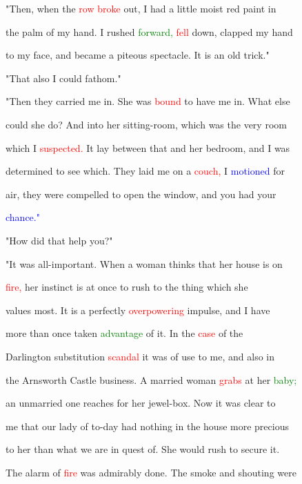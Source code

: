 "Then, when the \textcolor{red}{row} \textcolor{red}{broke} out, I had a little moist red paint in

 the palm of my hand. I rushed \textcolor{green}{forward,} \textcolor{red}{fell} down, clapped my hand

 to my face, and became a piteous \textcolor{BurntOrange}{spectacle.} It is an old \textcolor{BurntOrange}{trick."}



 "That also I could fathom."



 "Then they carried me in. She was \textcolor{red}{bound} to have me in. What else

 could she do? And into her sitting-room, which was the very room

 which I \textcolor{red}{suspected.} It lay between that and her bedroom, and I was

 determined to see which. They laid me on a \textcolor{red}{couch,} I \textcolor{blue}{motioned} for

 air, they were compelled to open the window, and you had your

 \textcolor{blue}{chance."}



 "How did that help you?"



 "It was all-important. When a woman thinks that her house is on

 \textcolor{red}{fire,} her instinct is at once to rush to the thing which she

 values most. It is a perfectly \textcolor{red}{overpowering} impulse, and I have

 more than once taken \textcolor{green}{advantage} of it. In the \textcolor{red}{case} of the

 Darlington substitution \textcolor{red}{scandal} it was of use to me, and also in

 the Arnsworth Castle business. A married woman \textcolor{red}{grabs} at her \textcolor{green}{baby;}

 an unmarried one reaches for her jewel-box. Now it was clear to

 me that our lady of to-day had nothing in the house more \textcolor{BurntOrange}{precious}

 to her than what we are in \textcolor{BurntOrange}{quest} of. She would rush to secure it.

 The \textcolor{BurntOrange}{alarm} of \textcolor{red}{fire} was admirably done. The smoke and \textcolor{BurntOrange}{shouting} were


